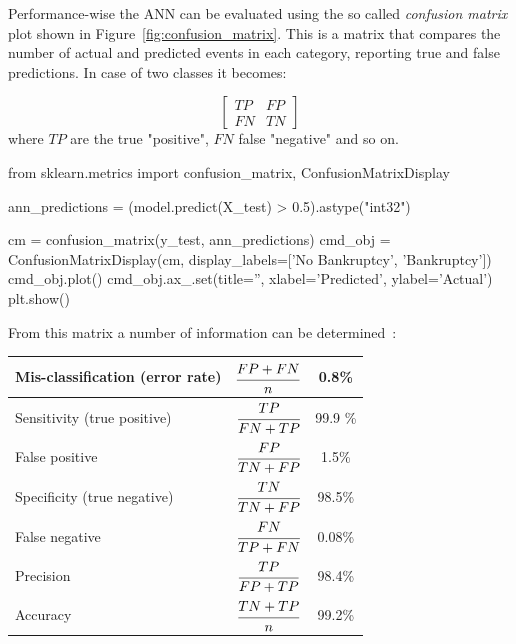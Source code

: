 Performance-wise the ANN can be evaluated using the so called \emph{confusion matrix} plot shown in Figure~\ref{fig:confusion_matrix}. This is a matrix that compares the number of actual and predicted events in each category, reporting true and false predictions. In case of two classes it becomes:

\begin{equation*}
\begin{bmatrix}
	TP & FP \\
	FN & TN  
\end{bmatrix}
\end{equation*}
\noindent
where $TP$ are the true "positive", $FN$ false "negative" and so on.

\begin{ipython}
from sklearn.metrics import confusion_matrix, ConfusionMatrixDisplay
	
ann_predictions = (model.predict(X_test) > 0.5).astype("int32")
	
cm = confusion_matrix(y_test, ann_predictions)
cmd_obj = ConfusionMatrixDisplay(cm, display_labels=['No Bankruptcy', 'Bankruptcy'])
cmd_obj.plot()
cmd_obj.ax_.set(title='', xlabel='Predicted', ylabel='Actual')
plt.show()
\end{ipython}
\noindent
From this matrix a number of information can be determined~\cite{bib:sensitivity}:

\makegapedcells\begin{table}[htbp]
\centering
\begin{tabular}{|l|c|c|}
\hline
Mis-classification (error rate) & $\cfrac{FP+FN}{n}$ & 0.8\% \\
\hline
Sensitivity (true positive) & $\cfrac{TP}{FN+TP}$ & 99.9 \% \\
\hline
False positive & $\cfrac{FP}{TN+FP}$ & 1.5\% \\
\hline
Specificity (true negative) & $\cfrac{TN}{TN+FP}$ &  98.5\% \\
\hline
False negative & $\cfrac{FN}{TP+FN}$ & 0.08\% \\
\hline
Precision & $\cfrac{TP}{FP+TP}$ & 98.4\% \\ 
\hline
Accuracy & $\cfrac{TN+TP}{n}$ & 99.2\% \\
\hline
\end{tabular}
\end{table}

